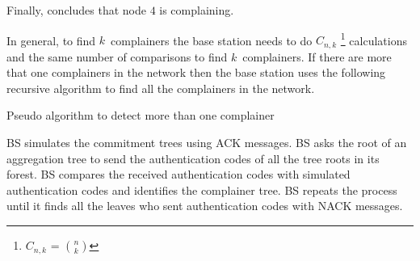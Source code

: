 		Finally, concludes that node $4 $ is complaining.
		
		In general, to find $k$\ complainers the base station needs to do $C_{n,k}$ \footnote{$C_{n,k}$ = $ n \choose k$} calculations and the same number of comparisons to find $k$\ complainers.
		If there are more that one complainers in the network then the base station uses the following recursive algorithm to find all the complainers in the network.
		\begin{algorithm}
			\caption{Pseudo algorithm to detect more than one complainer}
			\label{algo:detect-a-complainer}
			\begin{algorithmic}[1]

				\STATE BS simulates the commitment trees using ACK messages.
				\STATE BS asks the root of an aggregation tree to send the authentication codes of all the tree roots in its forest.
				\STATE BS compares the received authentication codes with simulated authentication codes and identifies the complainer tree.
				\STATE BS repeats the process until it finds all the leaves who sent authentication codes with NACK messages. 
			\end{algorithmic}
		\end{algorithm}

